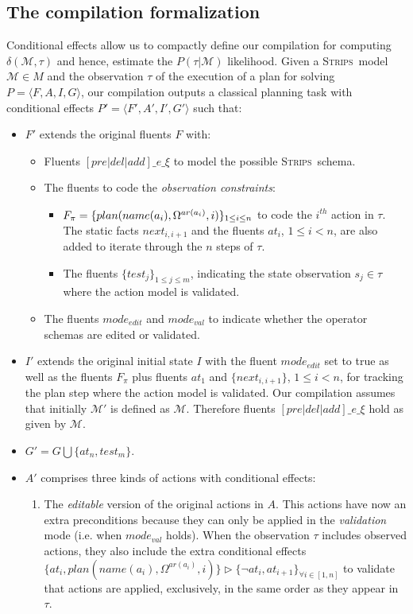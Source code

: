 \documentclass[letterpaper]{article} %
\newcommand{\tup}[1]{{\langle #1 \rangle}}
\newcommand{\strips}{\textsc{Strips}}     %
\begin{document}
\subsection{The compilation formalization}
Conditional effects allow us to compactly define our compilation for computing $\delta(\mathcal{M},\tau)$ and hence, estimate the $P(\tau|\mathcal{M})$ likelihood. Given a \strips\ model $\mathcal{M}\in M$ and the observation $\tau$ of the execution of a plan for solving $P=\tup{F,A,I,G}$, our compilation outputs a classical planning task with conditional effects $P'=\tup{F',A',I',G'}$ such that:
\begin{itemize}
\item $F'$ extends the original fluents $F$ with:
\begin{itemize}
\item Fluents $[pre|del|add]\_e\_\xi$ to model the possible \strips\ schema. 
\item The fluents to code the {\em observation constraints}:
\begin{itemize}
\item $F_{\pi}=\{plan(name(a_i),\Omega^{ar(a_i)},i)\}_{\small 1\leq i\leq n}$ to code the $i^{th}$ action in $\tau$. The static facts $next_{i,i+1}$ and the fluents $at_i$, {\small $1\leq i< n$}, are also added to iterate through the $n$ steps of $\tau$.
\item The fluents $\{test_j\}_{1\leq j\leq m}$, indicating the state observation $s_j\in\tau$ where the action model is validated.
\end{itemize}
\item The fluents $mode_{edit}$ and $mode_{val}$ to indicate whether the operator schemas are edited or validated.
\end{itemize}
\item $I'$ extends the original initial state $I$ with the fluent $mode_{edit}$ set to true as well as the fluents $F_{\pi}$ plus fluents $at_1$ and $\{next_{i,i+1}\}$, {\small $1\leq i<n$}, for tracking the plan step where the action model is validated. Our compilation assumes that initially $\mathcal{M}'$ is defined as $\mathcal{M}$. Therefore fluents $[pre|del|add]\_e\_\xi$ hold as given by $\mathcal{M}$.

\item $G'=G\bigcup\{at_n,test_m\}$.
\item $A'$ comprises three kinds of actions with conditional effects:
\begin{enumerate}
\item The {\em editable} version of the original actions in $A$. This actions have now an extra preconditions because they can only be applied in the {\em validation} mode (i.e. when $mode_{val}$ holds). When the observation $\tau$ includes observed actions, they also include the extra conditional effects $\{at_{i},plan(name(a_i),\Omega^{ar(a_i)},i)\}\rhd\{\neg at_{i},at_{i+1}\}_{\forall i\in [1,n]}$ to validate that actions are applied, exclusively, in the same order as they appear in $\tau$.\\


\end{enumerate}
\end{itemize}
\end{document}
